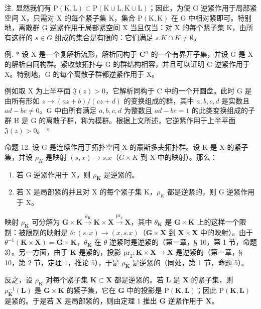 注. 显然我们有 \(\mathrm{P}(\mathrm{K},\mathrm{L})\subset\mathrm{P}(\mathrm{K}\cup\mathrm{L},\mathrm{K}\cup\mathrm{L})\)；因此，为使 G 逆紧作用于局部紧空间 X，只需对 X 的每个紧子集 K，集合 \(\mathrm{P}(\mathrm{K},\mathrm{K})\) 在 G 中相对紧即可。特别地，离散群 G 逆紧作用于局部紧空间 X 当且仅当：对 X 的每个紧子集 K，由所有这样的 \(s\in G\) 组成的集合是有限的：它们满足 \(s.K\cap K\neq\emptyset\)。

例. * 设 X 是一个复解析流形，解析同构于 \(\mathbf{C}^n\) 的一个有界开子集，并设 G 是 X 的解析自同构群。紧收敛拓扑与 G 的群结构相容，并且可以证明 G 逆紧作用于 X。特别地，G 的每个离散子群都逆紧作用于 X。

例如取 X 为上半平面 \(\mathfrak{J}(z)>0\)，它解析同构于 C 中的一个开圆盘。此时 G 是由所有形如 \(z\to (az+b)/(cz+d)\) 的变换组成的群，其中 \(a,b,c,d\) 是实数且 \(ad-bc\neq0\)。G 中由所有满足 \(a,b,c,d\) 为整数且 \(ad-bc=1\) 的此类变换组成的子群 H 是 G 的离散子群，称为模群。根据上文所述，它逆紧作用于上半平面 \(\mathfrak{J}(z)>0\)。 *

命题 12. 设 G 是连续作用于拓扑空间 X 的豪斯多夫拓扑群。设 K 是 X 的紧子集，并设 \(\rho_{K}\) 是映射 \((s, x) \to s.x\)（\(G \times K\) 到 X 中的映射）。那么：

\begin{enumerate}
\def\labelenumi{\alph{enumi})}
\item
  若 G 逆紧作用于 X，则 \(\rho_{\mathbf{K}}\) 是逆紧的。
\item
  若 X 是局部紧的并且对 X 的每个紧子集 K，\(\rho_{K}\) 都是逆紧的，则 G 逆紧作用于 X。
\end{enumerate}

映射 \(\rho_{\mathbf{K}}\) 可分解为 \(\mathbf{G} \times \mathbf{K} \xrightarrow{\theta_{\mathbf{K}}} \mathbf{K} \times \mathbf{X} \xrightarrow{\mathrm{pr}_2} \mathbf{X}\)，其中 \(\theta_{\mathbf{K}}\) 是 \(\mathbf{G} \times \mathbf{K}\) 上的这样一个限制：被限制的映射是 \(\theta: (s, x) \to (x, s.x)\)（\(\mathbf{G} \times \mathbf{X}\) 到 \(\mathbf{X} \times \mathbf{X}\) 中的映射）。由于 \(\theta^{-1}(\mathbf{K} \times \mathbf{X}) = \mathbf{G} \times \mathbf{K}\)，\(\theta_{\mathbf{K}}\) 在 \(\theta\) 逆紧时是逆紧的（第一章，§ 10，第 1 节，命题 3）。另一方面，由于 \(\mathbf{K}\) 是紧的，投影 \(\mathrm{pr}_2: \mathbf{K} \times \mathbf{X} \to \mathbf{X}\) 是逆紧的（第一章，§ 10，第 2 节，定理 1，推论 5），于是 \(\rho_{\mathbf{K}}\) 是逆紧的（同处，第 1 节，命题 5）。

反之，设 \(\rho_{\mathbf{K}}\) 对每个紧子集 \(\mathbf{K} \subset \mathbf{X}\) 都是逆紧的。若 \(\mathbf{L}\) 是 \(\mathbf{X}\) 的紧子集，则 \(\rho_{\mathbf{K}}^{-1}(\mathbf{L})\) 是 \(\mathbf{G} \times \mathbf{K}\) 的紧子集，它在 \(\mathbf{G}\) 中的投影是 \(\mathrm{P}(\mathbf{K}, \mathbf{L})\)；因此 \(\mathrm{P}(\mathbf{K}, \mathbf{L})\) 是紧的。于是若 \(\mathbf{X}\) 是局部紧的，则由定理 1 推出 \(\mathbf{G}\) 逆紧作用于 \(\mathbf{X}\)。

